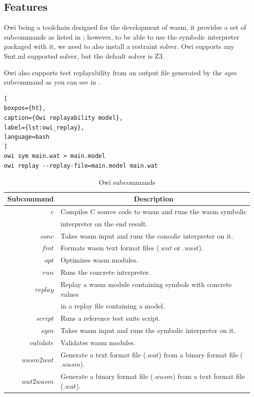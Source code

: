 \subsection{Features}

Owi being a toolchain designed for the development of \acrshort{wasm}, it provides a set of subcommands as listed in ; however, to be able to use the symbolic interpreter packaged with it, we need to also install a restraint solver. Owi supports any Smt.ml supported solver, but the default solver is Z3.

Owi also supports test replayability from an output file generated by the $sym$ subcommand as you can see in .

\begin{lstlisting}[
boxpos={ht},
caption={Owi replayability model},
label={lst:owi_replay},
language=bash
]
owi sym main.wat > main.model
owi replay --replay-file=main.model main.wat
\end{lstlisting}

\begin{table}[ht]
    \centering
    \begin{tabular}{r|l}
    \multicolumn{1}{c|}{Subcommand} & \multicolumn{1}{c}{Description} \\
    \hline
    \hline
    $c$ & Compiles C source code to \acrshort{wasm} and runs the \acrshort{wasm} symbolic \\& interpreter on the end result. \\
    $conc$ & Takes \acrshort{wasm} input and runs the concolic interpreter on it.\\
    $fmt$ & Formats \acrlong{wasm} text format files ($.wat$ or $.wast$).\\
    $opt$ & Optimizes \acrlong{wasm} modules.\\
    $run$ & Runs the concrete interpreter.\\
    $replay$ & Replay a \acrshort{wasm} module containing symbols with concrete values\\& in a replay file containing a model.\\
    $script$ & Runs a reference test suite script.\\
    $sym$ & Takes \acrshort{wasm} input and runs the symbolic interpreter on it.\\
    $validate$ & Validates \acrlong{wasm} modules.\\
    $wasm2wat$ & Generate a text format file ($.wat$) from a binary format file ($.wasm$).\\
    $wat2wasm$ & Generate a binary format file ($.wasm$) from a text format file ($.wat$).\\
    \end{tabular}
    \caption{Owi subcommands}
    \label{tab:owi_features}
\end{table}

